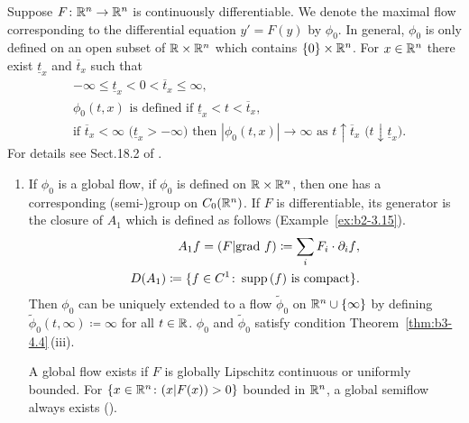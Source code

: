 \begin{example}\label{ex:b3-4.6}
	Suppose $F \colon \mathbb{R}^n \to \mathbb{R}^n$ is continuously differentiable.
	We denote the maximal flow corresponding to the differential equation%
    $y' = F(y)$ by $\phi_{0}$.
	In general, $\phi_{0}$ is only defined on an open subset of\/ $\mathbb{R} \times \mathbb{R}^n$ which contains $\{0\} \times \mathbb{R}^n$.
	For $x \in \mathbb{R}^n$ there exist $\underline{t}_{x}$ and $\overline{t}_{x}$ such that
	\begin{equation}\label{eq:b3-4.11}
		\begin{aligned}
			&-\infty \leq \underline{t}_{x} < 0 < \overline{t}_{x} \leq \infty ,  \\
			&\phi_{0}(t,x) \text{ is defined if } \underline{t}_{x} < t < \overline{t}_{x} ,  \\
			&\text{if } \overline{t}_{x} < \infty \text{ (}\underline{t}_{x} > -\infty\text{)} \text{ then } |\phi_{0}(t,x)| \to \infty \text{ as } t\uparrow\overline{t}_{x} \text{ (}t\downarrow\underline{t}_{x}\text{)}.
		\end{aligned}
	\end{equation}
	For details see Sect.18.2 of \textcite{dieudonne:1971}.
	\begin{enumerate}[\upshape (i), wide, labelindent=.25em]
	\item
	If\/ $\phi_{0}$ is a global flow, \ie if\/ $\phi_{0}$ is defined on $\mathbb{R} \times \mathbb{R}^n$, then one has a corresponding (semi-)group on $C_{0}(\mathbb{R}^n)$.
	If\/ $F$ is differentiable, its generator is the closure of\/ $A_{1}$ which is defined as follows (\cf Example~\ref{ex:b2-3.15}).
	\begin{equation}\label{eq:b3-4.12}
		\begin{aligned}
			A_{1}f = (F|\text{grad }f) \coloneq 
            {  \sum_i F_{i} \cdot \partial_{i}f}  ,  \\
			D(A_{1}) \coloneq \{f \in C^1 \colon \mathop{}\!\mathrm{supp}\,(f)  \text{ is compact}\}.
		\end{aligned}
	\end{equation}
	Then $\phi_{0}$ can be uniquely extended to a flow $\tilde{\phi}_{0}$ on $\mathbb{R}^n\cup\{\infty\}$ by defining $\tilde{\phi}_{0}(t,\infty) \coloneq \infty$ for all $t \in \mathbb{R}$.
	$\phi_{0}$ and $\tilde{\phi}_{0}$ satisfy condition Theorem~\ref{thm:b3-4.4}\,(iii).

    A global flow exists if\/ $F$ is globally Lipschitz continuous or uniformly bounded. 
    For $\{x \in \mathbb{R}^n \colon (x|F(x)) > 0\}$ bounded in $\mathbb{R}^n$, a global semiflow always exists (\cf \textcite[Section~5.2]{deimling:1977}).
    

\end{enumerate}
\end{example}
